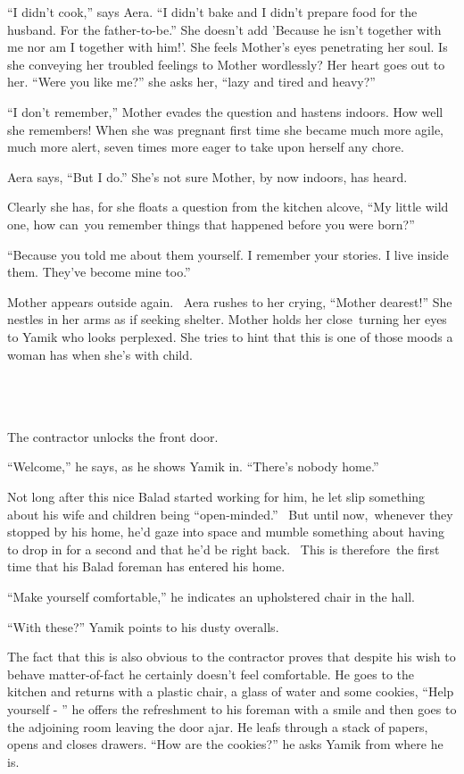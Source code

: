 \documentclass[twoside,11pt]{book}
\begin{document}
``I didn't cook,'' says Aera. ``I didn't bake and I didn't prepare food for the
husband. For the father-to-be.'' She doesn't add 'Because he isn't together with me nor am I together with
him!'. She feels Mother's eyes penetrating her soul. Is she conveying her troubled feelings to Mother wordlessly? Her
heart goes out to her. ``Were you like me?'' she asks her, ``lazy and tired and heavy?''

``I don't remember,'' Mother evades the question and hastens indoors. How well she remembers!
When she was pregnant first time she became much more agile, much more alert, seven times more eager to take upon
herself any chore.~~~

Aera says, ``But I do.'' She's not sure Mother, by now indoors, has heard.

Clearly she has, for she floats a question from the kitchen alcove, ``My little wild one, how can~you
remember things that happened before you were born?''

``Because you told me about them yourself. I remember your stories. I live inside them. They've become mine
too.''

Mother appears outside again. ~Aera rushes to her crying, ``Mother dearest!'' She nestles in
her arms as if seeking shelter. Mother holds her close~turning her eyes to Yamik who looks perplexed. She tries to hint
that this is one of those moods a woman has when she's with child.

~

\chapter{}

The contractor unlocks the front door.

``Welcome,'' he says, as he shows Yamik in. ``There's nobody home.''


Not long after this nice Balad started working for him, he let slip something about his wife and children being
``open-minded.'' \ But until now,~whenever they stopped by his home, he'd gaze into space and mumble something about
having to drop in for a second and that he'd be right back. ~This is therefore~the first time that his Balad foreman
has entered his home.

``Make yourself comfortable,'' he indicates an upholstered chair in the hall.~

``With these?'' Yamik points to his dusty overalls.

The fact that this is also obvious to the contractor proves that despite his wish to behave matter-of-fact he certainly
doesn't feel comfortable. He goes to the kitchen and returns with a plastic chair, a glass of water and some cookies,
``Help yourself - '' he offers the refreshment to his foreman with a smile and then goes to
the adjoining room leaving the door ajar. He leafs through a stack of papers, opens and closes drawers.
``How are the cookies?'' he asks Yamik from where he is.
\end{document}
